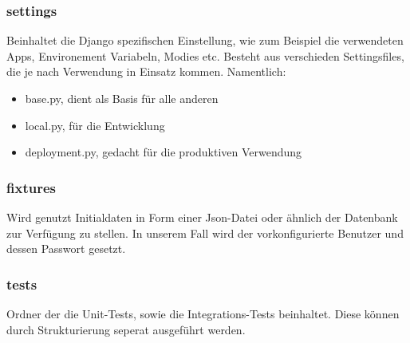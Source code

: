 \subsubsection{settings}
Beinhaltet die Django spezifischen Einstellung, wie zum Beispiel die verwendeten Apps, Environement Variabeln, Modies etc. Besteht aus verschieden Settingsfiles, die je nach Verwendung in Einsatz kommen. Namentlich:
\begin{itemize}
    \item base.py, dient als Basis für alle anderen
    \item local.py, für die Entwicklung
    \item deployment.py, gedacht für die produktiven Verwendung 
\end{itemize}

\subsubsection{fixtures}
Wird genutzt  Initialdaten in Form einer Json-Datei oder ähnlich der Datenbank zur Verfügung zu stellen. In unserem Fall wird der vorkonfigurierte Benutzer und dessen Passwort gesetzt.

\subsubsection{tests}
Ordner der die Unit-Tests, sowie die Integrations-Tests beinhaltet. Diese können durch Strukturierung seperat ausgeführt werden.
\newpage